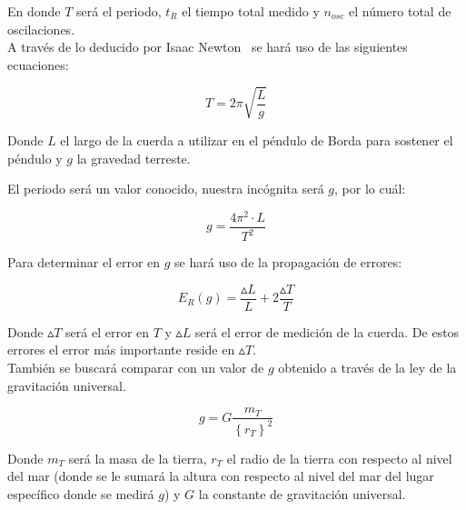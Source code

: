 \documentclass[a4paper,twocolumn]{article}
\begin{document}
En donde $T$ será el periodo, $t_{R}$ el tiempo total medido y $n_{osc}$ el número total de oscilaciones.%
\\

A través de lo deducido por Isaac Newton~\cite{b6} se hará uso de las siguientes ecuaciones:

\begin{large}
    \begin{equation*}
        T=2 \pi \sqrt{\frac{L}{g}}
    \end{equation*}
\end{large}

Donde $L$ el largo de la cuerda a utilizar en el péndulo de Borda para sostener el péndulo y $g$ la gravedad terreste.

El periodo será un valor conocido, nuestra incógnita será $g$, por lo cuál:%

\begin{large}
    \begin{equation} \label{e1}
        g=\frac{4 \pi ^{2} \cdot L}{T^{2}}
    \end{equation}
\end{large}

Para determinar el error en $g$ se hará uso de la propagación de errores:\cite{b8}

\begin{large}
    \begin{equation} \label{e2}
        E_{R}(g)=\frac{\vartriangle L}{L}+2\frac{\vartriangle T}{T}
    \end{equation}
\end{large}

Donde $\vartriangle T$ será el error en $T$ y $\vartriangle L$ será el error de medición de la cuerda. De estos errores el error más importante reside en $\vartriangle T$.%
\\

También se buscará comparar con un valor de $g$ obtenido a través de la ley de la gravitación universal\cite{b5}.

\begin{large}
    \begin{equation} \label{e4}
        g=G\frac{m_{T}}{\left\{ r_{T} \right\} ^{2}}
    \end{equation}
\end{large}

Donde $m_{T}$ será la masa de la tierra\cite{b10}, $r_{T}$\cite{b10} el radio de la tierra con respecto al nivel del mar (donde se le sumará la altura con respecto al nivel del mar del lugar específico donde se medirá $g$) y $G$ la constante de gravitación universal\cite{b1}.
\end{document}
